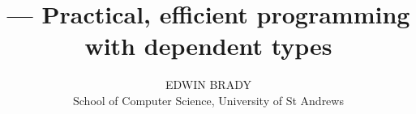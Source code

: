 \documentclass{acmtrans2m}
\title{\Idris{} --- Practical, efficient programming with dependent types}
\author{EDWIN BRADY\\ School of Computer Science, University of St Andrews}
\begin{document}
\begin{bottomstuff}
\end{bottomstuff}

\maketitle












%

\end{document}
